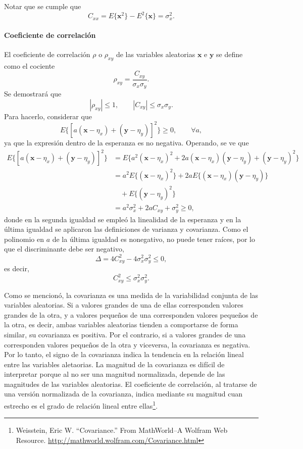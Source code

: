 \documentclass[a4paper]{report}
\newcommand{\x}{\mathbf{x}}
\newcommand{\y}{\mathbf{y}}
\begin{document}
Notar que se cumple que
\[
 C_{xx}=E\{\x^2\}-E^2\{\x\}=\sigma_x^2.
\]

\paragraph{Coeficiente de correlación}

El coeficiente de correlación \(\rho\) o \(\rho_{xy}\) de las variables aleatorias \(\x\) e \(\y\) se define como el cociente
\begin{equation}\label{eq:correlation_coefficient_definition}
 \rho_{xy}=\frac{C_{xy}}{\sigma_x\sigma_y}.
\end{equation}
Se demostrará que
\[
 |\rho_{xy}|\leq1,\qquad |C_{xy}|\leq \sigma_x\sigma_y.
\]
Para hacerlo, considerar que
\[
 E\{[a(\x-\eta_x)+(\y-\eta_y)]^2\}\geq 0,\qquad \forall a,
\]
ya que la expresión dentro de la esperanza es no negativa. Operando, se ve que
\small
\begin{align}\label{eq:covariance_rho_relation_deduction}
 E\{[a(\x-\eta_x)+(\y-\eta_y)]^2\}&=E\{a^2(\x-\eta_x)^2+2a(\x-\eta_x)(\y-\eta_y)+(\y-\eta_y)^2\}\nonumber\\
   &=a^2E\{(\x-\eta_x)^2\}+2aE\{(\x-\eta_x)(\y-\eta_y)\}\nonumber\\
   &\quad+E\{(\y-\eta_y)^2\}\nonumber\\
   &=a^2\sigma_x^2+2aC_{xy}+\sigma_y^2\geq0,
\end{align}
\normalsize
donde en la segunda igualdad se empleó la linealidad de la esperanza y en la última igualdad se aplicaron las definiciones de varianza y covarianza. Como el polinomio en \(a\) de la última igualdad es nonegativo, no puede tener raíces, por lo que el discriminante debe ser negativo,
\[
 \Delta=4C_{xy}^2-4\sigma_x^2\sigma_y^2\leq 0,
\]
es decir,
\[
 C_{xy}^2\leq \sigma_x^2\sigma_y^2.
\]

Como se mencionó, la covarianza es una medida de la variabilidad conjunta de las variables aleatorias. Si a valores grandes de una de ellas corresponden valores grandes de la otra, y a valores pequeños de una corresponden valores pequeños de la otra, es decir, ambas variables aleatorias tienden a comportarse de forma similar, su covarianza es positiva. Por el contrario, si a valores grandes de una corresponden valores pequeños de la otra y viceversa, la covarianza es negativa. Por lo tanto, el signo de la covarianza indica la tendencia en la relación lineal entre las variables aletaorias. La magnitud de la covarianza es difícil de interpretar porque al no ser una magnitud normalizada, depende de las magnitudes de las variables aleatorias. El coeficiente de correlación, al tratarse de una versión normalizada de la covarianza, indica mediante su magnitud cuan estrecho es el grado de relación lineal entre ellas\footnote{Weisstein, Eric W. ``Covariance.'' From MathWorld--A Wolfram Web Resource. \url{http://mathworld.wolfram.com/Covariance.html}}.
\end{document}

